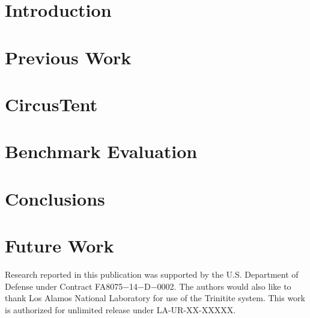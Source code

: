 \documentclass[sigconf]{acmart}
\begin{document}


\maketitle

\section{Introduction}
\label{sec:introduction}


\section{Previous Work}
\label{sec:previous_work}


\section{CircusTent}
\label{sec:circustent}


\section{Benchmark Evaluation}
\label{sec:benchmark_evaluation}


\section{Conclusions}
\label{sec:conclusions}


\section{Future Work}
\label{sec:future_work}


\begin{acks}
Research reported in this publication was supported by the U.S. Department of Defense under Contract FA8075$-$14$-$D$-$0002.
The authors would also like to thank Los Alamos National Laboratory for use of the Trinitite system.
This work is authorized for unlimited release under LA-UR-XX-XXXXX.
\end{acks}




\end{document}
